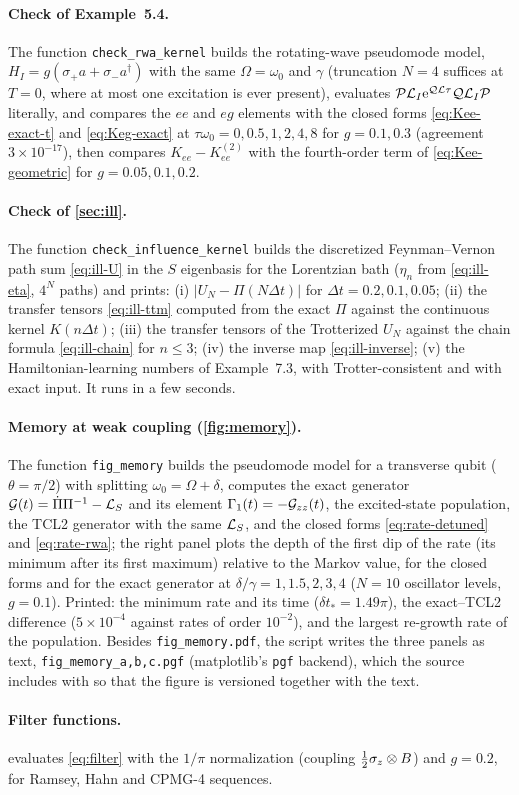 \paragraph{Check of Example~5.4.}
The function \texttt{check\_rwa\_kernel} builds the rotating-wave pseudomode model, $H_I=g(\sigma_+a+\sigma_-a^\dagger)$ with the same $\Omega=\omega_0$ and $\gamma$ (truncation $N=4$ suffices at $T=0$, where at most one excitation is ever present), evaluates $\mathcal{P}\mathcal{L}_I\mathrm{e}^{\mathcal{Q}\mathcal{L}\tau}\mathcal{Q}\mathcal{L}_I\mathcal{P}$ literally, and compares the $ee$ and $eg$ elements with the closed forms \eqref{eq:Kee-exact-t} and \eqref{eq:Keg-exact} at $\tau\omega_0=0,0.5,1,2,4,8$ for $g=0.1,0.3$ (agreement $3\times10^{-17}$), then compares $K_{ee}-K^{(2)}_{ee}$ with the fourth-order term of \cref{eq:Kee-geometric} for $g=0.05,0.1,0.2$.

\paragraph{Check of \cref{sec:ill}.}
The function \texttt{check\_influence\_kernel} builds the discretized Feynman--Vernon path sum \eqref{eq:ill-U} in the $S$ eigenbasis for the Lorentzian bath ($\eta_n$ from \cref{eq:ill-eta}, $4^N$ paths) and prints: (i) $|U_N-\Pi(N\Delta t)|$ for $\Delta t=0.2,0.1,0.05$; (ii) the transfer tensors \eqref{eq:ill-ttm} computed from the exact $\Pi$ against the continuous kernel $K(n\Delta t)$; (iii) the transfer tensors of the Trotterized $U_N$ against the chain formula \eqref{eq:ill-chain} for $n\le3$; (iv) the inverse map \eqref{eq:ill-inverse}; (v) the Hamiltonian-learning numbers of Example~7.3, with Trotter-consistent and with exact input.
It runs in a few seconds.

\paragraph{Memory at weak coupling (\cref{fig:memory}).}
The function \texttt{fig\_memory} builds the pseudomode model for a transverse qubit ($\theta=\pi/2$) with splitting $\omega_0=\Omega+\delta$, computes the exact generator $\mathcal{G}(t)=\dot\Pi\Pi^{-1}-\mathcal{L}_S$ and its element $\Gamma_1(t)=-\mathcal{G}_{zz}(t)$, the excited-state population, the TCL2 generator with the same $\mathcal{L}_S$, and the closed forms \eqref{eq:rate-detuned} and \eqref{eq:rate-rwa}; the right panel plots the depth of the first dip of the rate (its minimum after its first maximum) relative to the Markov value, for the closed forms and for the exact generator at $\delta/\gamma=1,1.5,2,3,4$ ($N=10$ oscillator levels, $g=0.1$).
Printed: the minimum rate and its time ($\delta t_*=1.49\pi$), the exact--TCL2 difference ($5\times10^{-4}$ against rates of order $10^{-2}$), and the largest re-growth rate of the population.
Besides \texttt{fig\_memory.pdf}, the script writes the three panels as text, \texttt{fig\_memory\_a,b,c.pgf} (matplotlib's \texttt{pgf} backend), which the source includes with \verb|| so that the figure is versioned together with the text.

\paragraph{Filter functions.}
 evaluates \cref{eq:filter} with the $1/\pi$ normalization (coupling $\tfrac12\sigma_z\otimes B$) and $g=0.2$, for Ramsey, Hahn and CPMG-4 sequences.

\clearpage
